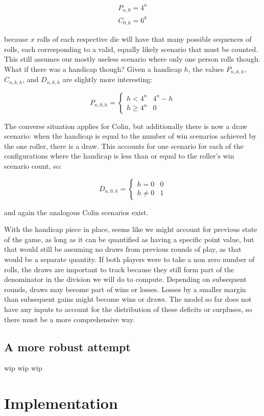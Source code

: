 \documentclass{article}
\begin{document}
\begin{align*}
    P_{n,0} = 4^n \\
    C_{0,k} = 6^k
\end{align*}

because $x$ rolls of each respective die will have that many possible sequences of rolls, each corresponding to a valid, equally likely scenario that must be counted.  This still assumes our mostly useless scenario where only one person rolls though.  What if there was a handicap though?  Given a handicap $h$, the values $P_{n,k,h}$, $C_{n,k,h}$, and $D_{n,k,h}$ are slightly more interesting:

\[
    P_{n,0,h} =
    \begin{cases}
        h < 4^n & 4^n - h \\
        h \geq 4^n & 0
    \end{cases}
\]

The converse situation applies for Colin, but additionally there is now a draw scenario: when the handicap is equal to the number of win scenarios achieved by the one roller, there is a draw.  This accounts for one scenario for each of the configurations where the handicap is less than or equal to the roller's win scenario count, so:

\[
    D_{n,0,h} =
    \begin{cases}
        h = 0 & 0 \\
        h \neq 0 & 1
    \end{cases}
\]

and again the analogous Colin scenarios exist.

With the handicap piece in place, seems like we might account for previous state of the game, as long as it can be quantified as having a specific point value, but that would still be assuming no draws from previous rounds of play, as that would be a separate quantity.  If both players were to take a non zero number of rolls, the draws are important to track because they still form part of the denominator in the division we will do to compute.  Depending on subsequent rounds, draws may become part of wins or losses.  Losses by a smaller margin than subsequent gains might become wins or draws.   The model so far does not have any inputs to account for the distribution of these deficits or surpluses, so there must be a more comprehensive way.

\subsection{A more robust attempt}

wip wip wip 

\section*{Implementation}

\end{document}
